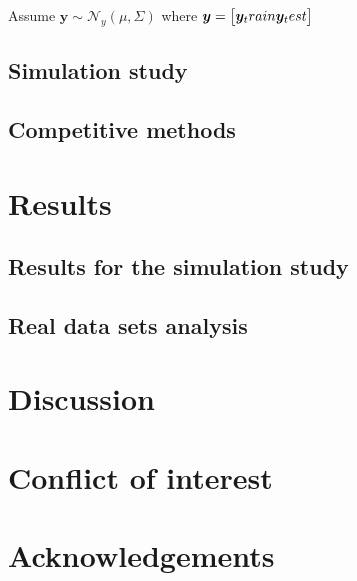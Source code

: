 \documentclass[11pt]{article}
\theoremstyle{plain}
\theoremstyle{definition}
\theoremstyle{remark}
\begin{document}
Assume $\bm{y}\sim\mathcal{N}_y(\mu,\Sigma)$ where
$\bm{y}=\big[\bm{y}_train\\\bm{y}_test\big]$






\subsection{Simulation study}



\subsection{Competitive methods}


\section{Results}

\subsection{Results for the simulation study}


\subsection{Real data sets analysis}


\section{Discussion}



\section{Conflict of interest}

\section{Acknowledgements}

\begin{thebibliography}{99}


\end{thebibliography}
\end{document}
